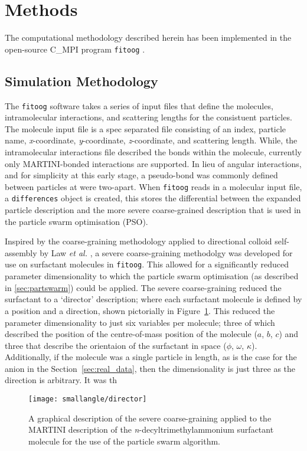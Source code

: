 \section{Methods}

The computational methodology described herein has been implemented in the open-source C\_MPI program \texttt{fitoog} \cite{mccluskey_arm61/fitoog_2019}.

\subsection{Simulation Methodology}

The \texttt{fitoog} software takes a series of input files that define the molecules, intramolecular interactions, and scattering lengths for the consistuent particles.
The molecule input file is a spec separated file consisting of an index, particle name, \emph{x}-coordinate, \emph{y}-coordinate, \emph{z}-coordinate, and scattering length.
While, the intramolecular interactions file described the bonds within the molecule, currently only MARTINI-bonded interactions are supported.
In lieu of angular interactions, and for simplicity at this early stage, a pseudo-bond was commonly defined between particles at were two-apart.
When \texttt{fitoog} reads in a molecular input file, a \texttt{differences} object is created, this stores the differential between the expanded particle description and the more severe coarse-grained description that is used in the particle swarm optimisation (PSO).

Inspired by the coarse-graining methodology applied to directional colloid self-assembly by Law \emph{et al.} \cite{law_coarse-grained_2016}, a severe coarse-graining methodolgy was developed for use on surfactant molecules in \texttt{fitoog}.
This allowed for a significantly reduced parameter dimensionality to which the particle swarm optimisation (as described in \ref{sec:partswarm}) could be applied.
The severe coarse-graining reduced the surfactant to a `director' description; where each surfactant molecule is defined by a position and a direction, shown pictorially in Figure~\ref{fig:director}.
This reduced the parameter dimensionality to just six variables per molecule; three of which described the position of the centre-of-mass position of the molecule ($a$, $b$, $c$) and three that describe the orientaion of the surfactant in space ($\phi$, $\omega$, $\kappa$).
Additionally, if the molecule was a single particle in length, as is the case for the  anion in the Section~\ref{sec:real_data}, then the dimensionality is just three as the direction is arbitrary.
It was th
%
\begin{figure}
    \centering
    \texttt{[image: smallangle/director]}
    \caption{A graphical description of the severe coarse-graining applied to the MARTINI description of the \emph{n}-decyltrimethylammonium surfactant molecule for the use of the particle swarm algorithm.}
    \label{fig:director}
\end{figure}
%

